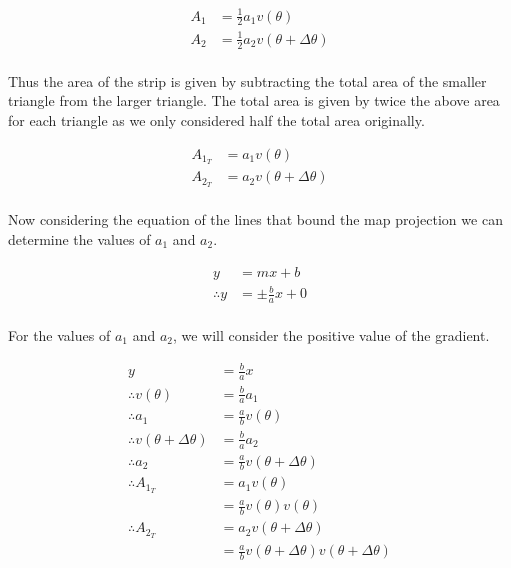 \documentclass[a4paper]{article}
\begin{document}
\begin{enumerate}[label=(\alph*)]
	\begin{align*}
	A_1 & = \frac{1}{2}a_{1}v(\theta)\\
	A_2 & = \frac{1}{2}a_{2}v(\theta + \Delta \theta)\\
	\end{align*}

	Thus the area of the strip is given by subtracting the total area of the smaller triangle from the larger triangle. The total area is given by twice the above area for each triangle as we only considered half the total area originally.

	\begin{align*}
	A_{1_T} & = a_{1}v(\theta)\\
	A_{2_T} & = a_{2}v(\theta + \Delta \theta)\\
	\end{align*}

	Now considering the equation of the lines that bound the map projection we can determine the values of $a_1$ and $a_2$.

	\begin{align*}
	y & = mx+b\\
	\therefore y & = \pm \frac{b}{a}x + 0\\
	\end{align*}

	For the values of $a_1$ and $a_2$, we will consider the positive value of the gradient.

	\begin{align*}
	y & = \frac{b}{a}x\\
	\therefore v(\theta) & = \frac{b}{a}{a_1}\\
	\therefore a_1 & = \frac{a}{b}v(\theta)\\
	\therefore v(\theta + \Delta \theta) & = \frac{b}{a}{a_2}\\
	\therefore a_2 & = \frac{a}{b}v(\theta + \Delta \theta)\\
	\therefore A_{1_T} & = a_{1}v(\theta)\\
	& = \frac{a}{b}v(\theta)v(\theta)\\
	\therefore A_{2_T} & = a_{2}v(\theta + \Delta \theta)\\
	& = \frac{a}{b}v(\theta + \Delta \theta)v(\theta + \Delta \theta)\\
	\end{align*}


\end{enumerate}
\end{document}
